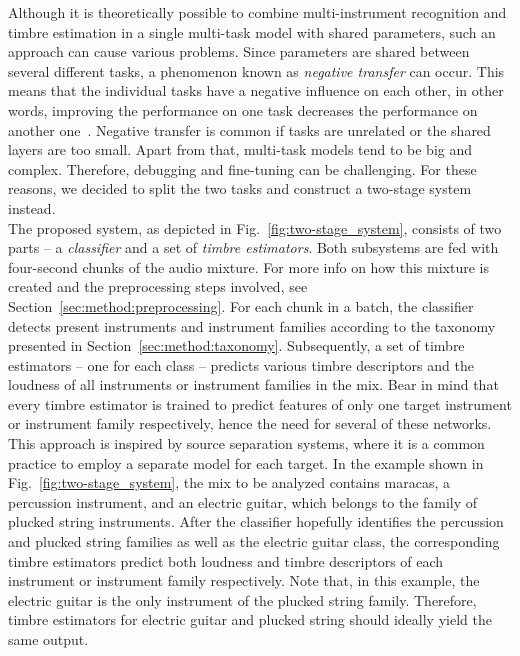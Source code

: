 Although it is theoretically possible to combine multi-instrument recognition and timbre estimation in a single multi-task model with shared parameters, such an approach can cause various problems. Since parameters are shared between several different tasks, a phenomenon known as \textit{negative transfer} can occur. This means that the individual tasks have a negative influence on each other, in other words, improving the performance on one task decreases the performance on another one~\cite{crawshaw2020multi}. Negative transfer is common if tasks are unrelated or the shared layers are too small. Apart from that, multi-task models tend to be big and complex. Therefore, debugging and fine-tuning can be challenging. For these reasons, we decided to split the two tasks and construct a two-stage system instead.\\

The proposed system, as depicted in Fig.~\ref{fig:two-stage_system}, consists of two parts -- a \textit{classifier} and a set of \textit{timbre estimators}. Both subsystems are fed with four-second chunks of the audio mixture. For more info on how this mixture is created and the preprocessing steps involved, see Section~\ref{sec:method:preprocessing}. For each chunk in a batch, the classifier detects present instruments and instrument families according to the taxonomy presented in Section~\ref{sec:method:taxonomy}. Subsequently, a set of timbre estimators -- one for each class -- predicts various timbre descriptors and the loudness of all instruments or instrument families in the mix. Bear in mind that every timbre estimator is trained to predict features of only one target instrument or instrument family respectively, hence the need for several of these networks. This approach is inspired by source separation systems, where it is a common practice to employ a separate model for each target. In the example shown in Fig.~\ref{fig:two-stage_system}, the mix to be analyzed contains maracas, a percussion instrument, and an electric guitar, which belongs to the family of plucked string instruments. After the classifier hopefully identifies the percussion and plucked string families as well as the electric guitar class, the corresponding timbre estimators predict both loudness and timbre descriptors of each instrument or instrument family respectively. Note that, in this example, the electric guitar is the only instrument of the plucked string family. Therefore, timbre estimators for electric guitar and plucked string should ideally yield the same output.\\

